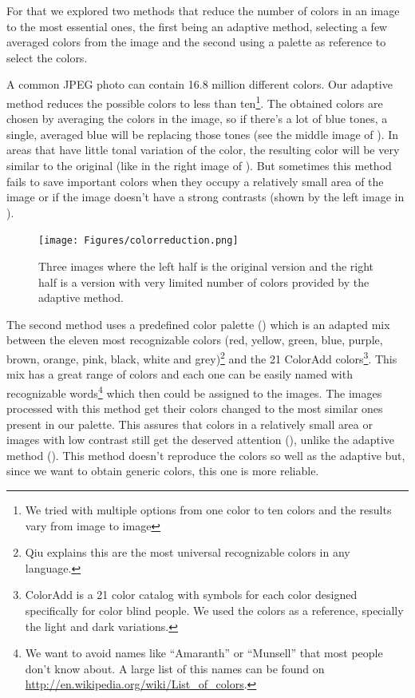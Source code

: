 For that we explored two methods that reduce the number of colors in an image to the most essential ones, the first being an adaptive method, selecting a few averaged colors from the image and the second using a palette as reference to select the colors.

A common JPEG photo can contain 16.8 million different colors. Our adaptive method reduces the possible colors to less than ten\footnote{We tried with multiple options from one color to ten colors and the results vary from image to image}. The obtained colors are chosen by averaging the colors in the image, so if there's a lot of blue tones, a single, averaged blue will be replacing those tones (see the middle image of ). In areas that have little tonal variation of the color, the resulting color will be very similar to the original (like in the right image of ). But sometimes this method fails to save important colors when they occupy a relatively small area of the image or if the image doesn't have a strong contrasts (shown by the left image in ).

\begin{figure}[ht]
	\centering
		\texttt{[image: Figures/colorreduction.png]}
	\caption{Three images where the left half is the original version and the right half is a version with very limited number of colors provided by the adaptive method.}
	\label{fig:sky}
\end{figure}




The second method uses a predefined color palette () which is an adapted mix between the eleven most recognizable colors (red, yellow, green, blue, purple, brown, orange, pink, black, white and grey)\footnote{Qiu \cite{Qiu:2007p1207} explains this are the most universal recognizable colors in any language.} and the 21 ColorAdd colors\footnote{ColorAdd is a 21 color catalog with symbols for each color designed specifically for color blind people. We used the colors as a reference, specially the light and dark variations.}. This mix has a great range of colors and each one can be easily named with recognizable words\footnote{We want to avoid names like ``Amaranth'' or ``Munsell'' that most people don't know about. A large list of this names can be found on \url{http://en.wikipedia.org/wiki/List_of_colors}.} which then could be assigned to the images. The images processed with this method get their colors changed to the most similar ones present in our palette. This assures that colors in a relatively small area or images with low contrast still get the deserved attention (), unlike the adaptive method (). This method doesn't reproduce the colors so well as the adaptive but, since we want to obtain generic colors, this one is more reliable.


